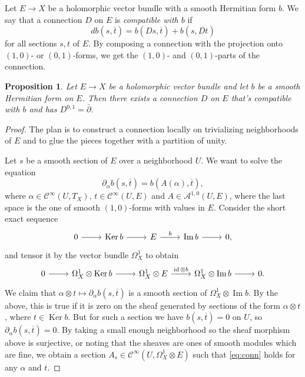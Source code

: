 \documentclass[10pt,a4paper]{amsart}
\newtheorem{prop}[theo]{Proposition}
\theoremstyle{definition}
\newcommand{\cc}[1]{\mathcal{#1}}
\def\ov#1{\overline{#1}}
\DeclareMathOperator{\im}{Im}
\DeclareMathOperator{\Ker}{Ker}
\DeclareMathOperator{\id}{id}
\begin{document}
Let $E \to X$ be a holomorphic vector bundle with a smooth Hermitian form $b$. We say that a connection $D$ on $E$ is \emph{compatible with $b$} if
\[
d b(s, \ov t) = b(Ds, \ov t) + b(s, \ov{Dt})
\]
for all sections $s, t$ of $E$. By composing a connection with the projection onto $(1,0)$- or $(0,1)$-forms, we get the $(1,0)$- and $(0,1)$-parts of the connection.


\begin{prop}
Let $E \to X$ be a holomorphic vector bundle and let $b$ be a smooth Hermitian form on $E$. Then there exists a connection $D$ on $E$ that's compatible with $b$ and has $D^{0,1} = \bar\partial$.
\end{prop}


\begin{proof}
The plan is to construct a connection locally on trivializing neighborhoods of $E$ and to glue the pieces together with a partition of unity.

Let $s$ be a smooth section of $E$ over a neighborhood $U$. We want to solve the equation
\begin{equation}
\label{eq:conn}
\partial_\alpha b(s, \ov t)
= b(A(\alpha), \ov t),
\end{equation}
where $\alpha \in \cc C^\infty(U, T_X)$, $t \in \cc C^\infty(U, E)$ and $A \in \cc A^{1,0}(U, E)$, where the last space is the one of smooth $(1,0)$-forms with values in $E$. Consider the short exact sequence
\[
\begin{tikzcd}
0 \ar[r] &
\Ker b \ar[r] &
E \ar[r,"b"] &
\im b \ar[r] &
0,
\end{tikzcd}
\]
and tensor it by the vector bundle $\Omega^1_X$ to obtain
\[
\begin{tikzcd}
0 \ar[r] &
\Omega^1_X \otimes \Ker b \ar[r] &
\Omega^1_X \otimes E \ar[r,"\id \otimes b"] &
\Omega^1_X \otimes \im b \ar[r] &
0.
\end{tikzcd}
\]
We claim that $\alpha \otimes t \mapsto \partial_\alpha b(s, \ov t)$ is a smooth section of $\Omega^1_X \otimes \im b$. By the above, this is true if it is zero on the sheaf generated by sections of the form $\alpha \otimes t$, where $t \in \Ker b$. But for such a section we have $b(s, \ov t) = 0$ on $U$, so $\partial_\alpha b(s, \ov t) = 0$. By taking a small enough neighborhood so the sheaf morphism above is surjective, or noting that the sheaves are ones of smooth modules which are fine, we obtain a section $A_s \in \cc C^\infty(U, \Omega_X^1 \otimes E)$ such that \eqref{eq:conn} holds for any $\alpha$ and $t$.


\end{proof}
\end{document}
